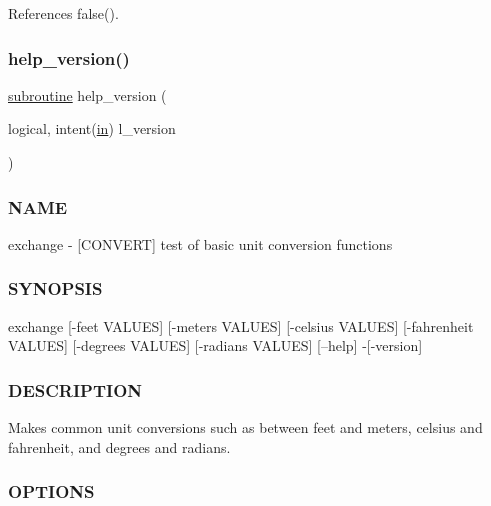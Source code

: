 References false().

\mbox{\label{exchange_8f90_a39c21619b08a3c22f19e2306efd7f766}} 
\subsubsection{\texorpdfstring{help\+\_\+version()}{help\_version()}}
{\footnotesize\ttfamily \hyperlink{M__stopwatch_83_8txt_acfbcff50169d691ff02d4a123ed70482}{subroutine} help\+\_\+version (\begin{DoxyParamCaption}\item[{logical, intent(\hyperlink{M__journal_83_8txt_afce72651d1eed785a2132bee863b2f38}{in})}]{l\+\_\+version }\end{DoxyParamCaption})}



\subsubsection*{N\+A\+ME}

exchange -\/ \mbox{[}C\+O\+N\+V\+E\+RT\mbox{]} test of basic unit conversion functions 

\subsubsection*{S\+Y\+N\+O\+P\+S\+IS}

\begin{DoxyVerb} exchange [-feet VALUES] [-meters VALUES]
          [-celsius VALUES] [-fahrenheit VALUES]
          [-degrees VALUES] [-radians VALUES]
          [--help] -[-version]
\end{DoxyVerb}


\subsubsection*{D\+E\+S\+C\+R\+I\+P\+T\+I\+ON}

Makes common unit conversions such as between feet and meters, celsius and fahrenheit, and degrees and radians.

\subsubsection*{O\+P\+T\+I\+O\+NS}

